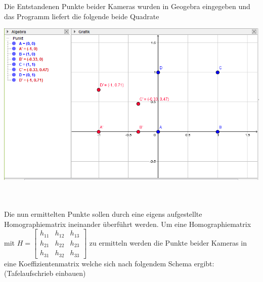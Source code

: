 Die Entstandenen Punkte beider Kameras wurden in Geogebra eingegeben und das Programm liefert die folgende beide Quadrate\\

\begin{minipage}{\linewidth}
	\centering
	\includegraphics[width=1.\linewidth]{images/Geogebra.png}
\end{minipage}\\ \\

Die nun ermittelten Punkte sollen durch eine eigens aufgestellte Homographiematrix ineinander überführt werden. Um eine Homographiematrix mit $
H=
\begin{bmatrix}
h_{11}&h_{12}&h_{13}\\
h_{21}&h_{22}&h_{23}\\
h_{31}&h_{32}&h_{33}
\end{bmatrix}
$ zu ermitteln werden die Punkte beider Kameras in eine Koeffizientenmatrix welche sich nach folgendem Schema ergibt: (Tafelaufschrieb einbauen)

